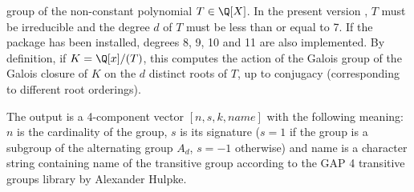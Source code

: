 \label{se:polgalois}
 group of the non-constant
polynomial $T\in\Q[X]$. In the present version \vers, $T$ must be irreducible
and the degree $d$ of $T$ must be less than or equal to 7. If the
 package has been installed, degrees 8, 9, 10 and 11 are also
implemented. By definition, if $K = \Q[x]/(T)$, this computes the action of
the Galois group of the Galois closure of $K$ on the $d$ distinct roots of
$T$, up to conjugacy (corresponding to different root orderings).

The output is a 4-component vector $[n,s,k,name]$ with the
following meaning: $n$ is the cardinality of the group, $s$ is its signature
($s=1$ if the group is a subgroup of the alternating group $A_d$, $s=-1$
otherwise) and name is a character string containing name of the transitive
group according to the GAP 4 transitive groups library by Alexander Hulpke.

